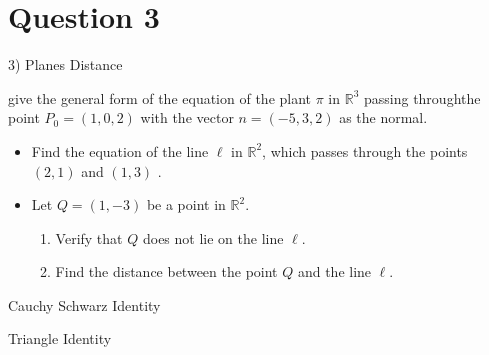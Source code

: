 \documentclass[12pt,a4paper]{article}
\begin{document}
\section*{Question 3}

3) Planes
Distance


give the general form of the equation of the plant $\pi$ in $\mathbb{R}^3$ passing throughthe point $P_0 =(1,0,2)$ with the vector $n=(-5,3,2)$ as the normal.





\begin{itemize}
	\item Find the equation of the line $\ell$ in $\mathbb{R}^2$, which  passes through the 
	points $(2,1)$ and $(1,3)$ .
	
	\item  Let $Q = (1, -3)$  be a point in $\mathbb{R}^2$.
	\begin{enumerate}
		\item Verify that $Q$ does not lie on the line $\ell$.
		
		\item Find the distance between the point $Q$ and the line $\ell$.
	\end{enumerate}
\end{itemize}

Cauchy Schwarz Identity

Triangle Identity

\end{document}

